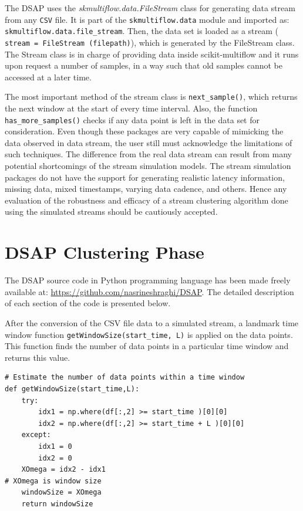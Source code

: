 The DSAP uses the \textit{skmultiflow.data.FileStream} class for generating data stream from any \texttt{CSV} file. It is part of the \texttt{skmultiflow.data} module and imported as: \texttt{skmultiflow.data.file\_stream}. Then, the data set is loaded as a stream (\texttt{ stream = FileStream (filepath)}), which is generated by the FileStream class. The Stream class is in charge of providing data inside scikit-multiflow and it runs upon request a number of samples, in a way such that old samples cannot be accessed at a later time. 

The most important method of the stream class is \texttt{next\_sample()}, which returns the next window at the start of every time interval. Also, the function \texttt{has\_more\_samples()} checks if any data point is left in the data set for consideration. Even though these packages are very capable of mimicking the data observed in data stream, the user still must acknowledge the limitations of such techniques. The difference from the real data stream can result from many potential shortcomings of the stream simulation models. The stream simulation packages do not have the support for generating realistic latency information, missing data, mixed timestamps, varying data cadence, and others. Hence any evaluation of the robustness and efficacy of a stream clustering algorithm done using the simulated streams should be cautiously accepted. 


\section{DSAP Clustering Phase}

The DSAP source code in Python programming language has been made freely available at: \url{https://github.com/nasrineshraghi/DSAP}. The detailed description of each section of the code is presented below.

After the conversion of the CSV file data to a simulated stream, a landmark time window function \texttt{getWindowSize(start\_time, L)} is applied on the data points. This function finds the number of data points in a particular time window and returns this value. 

\begin{lstlisting}
# Estimate the number of data points within a time window
def getWindowSize(start_time,L):
    try:
        idx1 = np.where(df[:,2] >= start_time )[0][0]
        idx2 = np.where(df[:,2] >= start_time + L )[0][0] 
    except:
        idx1 = 0
        idx2 = 0
    XOmega = idx2 - idx1
# XOmega is window size
    windowSize = XOmega
    return windowSize
\end{lstlisting}


